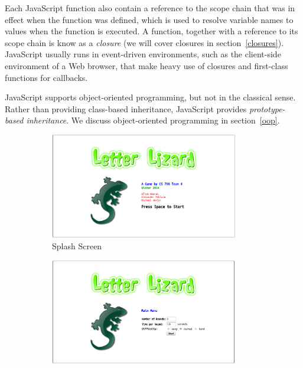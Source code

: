 Each JavaScript function also contain a reference to the scope chain that was
in effect when the function was defined, which is used to resolve variable
names to values when the function is executed. A function, together with a
reference to its scope chain is know as a \emph{closure} (we will cover closures
in section~\ref{closures}). 
JavaScript usually runs in event-driven environments, such as the client-side
environment of a Web browser, that make heavy use of closures and first-class 
functions for callbacks.

JavaScript supports object-oriented programming, but not in the classical
sense. Rather than providing class-based inheritance, JavaScript provides
\emph{prototype-based inheritance}. We discuss object-oriented programming
in section~\ref{oop}.

\begin{figure}
    \centering
    \begin{subfigure}{0.49\textwidth}
        \includegraphics[width=0.9\textwidth]{../screenshots/LetterLizardJS-SplashScreen2.png}
        \caption{Splash Screen}
        \label{lljssplash}
    \end{subfigure}
    \begin{subfigure}{0.49\textwidth}
        \includegraphics[width=0.9\textwidth]{../screenshots/LetterLizardJS-MainMenu2.png}

\end{subfigure}
\end{figure}
